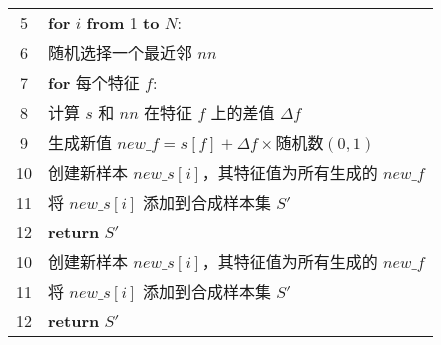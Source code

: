 \begin{table}[htbp]
\begin{tabularx}{1.0\textwidth}{cl}
		5  & \quad \textbf{for} $i$ \textbf{from} 1 \textbf{to} $N$:                        \\
		6  & \quad\quad 随机选择一个最近邻 $nn$                                             \\
		7  & \quad\quad \textbf{for} 每个特征 $f$:                                          \\
		8  & \quad\quad\quad 计算 $s$ 和 $nn$ 在特征 $f$ 上的差值 $\Delta f$                \\
		9  & \quad\quad\quad 生成新值 $new\_f = s[f] + \Delta f \times \text{随机数}(0, 1)$ \\
		10 & \quad\quad 创建新样本 $new\_s[i]$，其特征值为所有生成的 $new\_f$               \\
		11 & \quad\quad 将 $new\_s[i]$ 添加到合成样本集 $S'$                                \\
		12 & \textbf{return} $S'$                                                           \\
		10 & \quad\quad 创建新样本 $new\_s[i]$，其特征值为所有生成的 $new\_f$               \\
		11 & \quad\quad 将 $new\_s[i]$ 添加到合成样本集 $S'$                                \\
		12 & \textbf{return} $S'$                                                           \\
		\bottomrule
	\end{tabularx}
\end{table}

